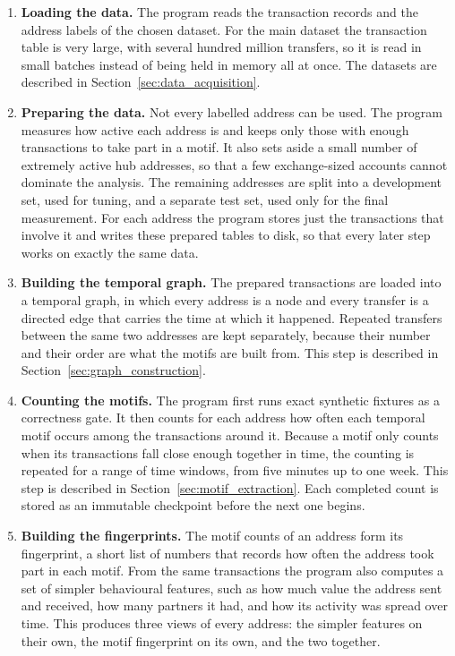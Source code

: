 \documentclass{thesisclass}
\begin{document}
\begin{enumerate}
  \item \textbf{Loading the data.} The program reads the transaction records and
        the address labels of the chosen dataset. For the main dataset the
        transaction table is very large, with several hundred million transfers,
        so it is read in small batches instead of being held in memory all at
        once. The datasets are described in Section~\ref{sec:data_acquisition}.

  \item \textbf{Preparing the data.} Not every labelled address can be used. The
        program measures how active each address is and keeps only those with
        enough transactions to take part in a motif. It also sets aside a small
        number of extremely active hub addresses, so that a few exchange-sized
        accounts cannot dominate the analysis. The remaining addresses are split
        into a development set, used for tuning, and a separate test set, used
        only for the final measurement. For each address the program stores just
        the transactions that involve it and writes these prepared tables to
        disk, so that every later step works on exactly the same data.

  \item \textbf{Building the temporal graph.} The prepared transactions are
        loaded into a temporal graph, in which every address is a node and every
        transfer is a directed edge that carries the time at which it happened.
        Repeated transfers between the same two addresses are kept separately,
        because their number and their order are what the motifs are built from.
        This step is described in Section~\ref{sec:graph_construction}.

  \item \textbf{Counting the motifs.} The program first runs exact synthetic
        fixtures as a correctness gate. It then counts for each address how
        often each temporal motif occurs among the transactions around it.
        Because a motif only counts when its transactions fall close enough
        together in time, the counting is repeated for a range of time windows,
        from five minutes up to one week. This step is described in
        Section~\ref{sec:motif_extraction}. Each completed count is stored as an
        immutable checkpoint before the next one begins.

  \item \textbf{Building the fingerprints.} The motif counts of an address form
        its fingerprint, a short list of numbers that records how often the
        address took part in each motif. From the same transactions the program
        also computes a set of simpler behavioural features, such as how much
        value the address sent and received, how many partners it had, and how
        its activity was spread over time. This produces three views of every
        address: the simpler features on their own, the motif fingerprint on its
        own, and the two together.


\end{enumerate}
\end{document}
